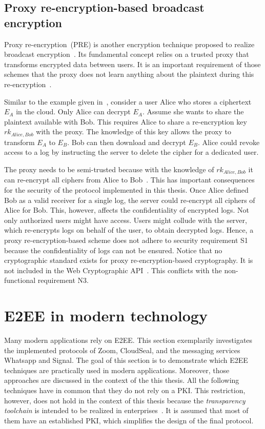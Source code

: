 \documentclass[../main.tex]{subfiles}
\begin{document}
\subsection{Proxy re-encryption-based broadcast encryption}
\label{sec:broadcast-proxy}
Proxy re-encryption~(PRE) is another encryption technique proposed to realize broadcast encryption~\cite{Hagg2022}.
Its fundamental concept relies on a trusted proxy that transforms encrypted data between users.
It is an important requirement of those schemes that the proxy does not learn anything about the plaintext during this re-encryption~\cite{Chen2018}.

Similar to the example given in~\cite{Hagg2022}, consider a user Alice who stores a ciphertext $E_A$ in the cloud.
Only Alice can decrypt $E_A$.
Assume she wants to share the plaintext available with Bob.
This requires Alice to share a re-encryption key $rk_{Alice,Bob}$ with the proxy.
The knowledge of this key allows the proxy to transform $E_A$ to $E_B$.
Bob can then download and decrypt $E_B$.
Alice could revoke access to a log by instructing the server to delete the cipher for a dedicated user.

The proxy needs to be semi-trusted because with the knowledge of $rk_{Alice,Bob}$ it can re-encrypt all ciphers from Alice to Bob~\cite{Chen2018}.
This has important consequences for the security of the protocol implemented in this thesis.
Once Alice defined Bob as a valid receiver for a single log, the server could re-encrypt all ciphers of Alice for Bob.
This, however, affects the confidentiality of encrypted logs.
Not only authorized users might have access.
Users might collude with the server, which re-encrypts logs on behalf of the user, to obtain decrypted logs.
Hence, a proxy re-encryption-based scheme does not adhere to security requirement S1 because the confidentiality of logs can not be ensured.
Notice that no cryptographic standard exists for proxy re-encryption-based cryptography.
It is not included in the Web Cryptographic API~\cite{WebCryptoApi2017}.
This conflicts with the non-functional requirement N3.

\section{E2EE in modern technology}
\label{sec:modern-e2ee}

Many modern applications rely on E2EE. 
This section exemplarily investigates the implemented protocols of Zoom, CloudSeal, and the messaging services Whatsapp and Signal.
The goal of this section is to demonstrate which E2EE techniques are practically used in modern applications.
Moreover, those approaches are discussed in the context of the this thesis.
All the following techniques have in common that they do not rely on a PKI.
This restriction, however, does not hold in the context of this thesis because the \emph{transparency toolchain} is intended to be realized in enterprises~\cite{Zieglmeier2021}.
It is assumed that most of them have an established PKI, which simplifies the design of the final protocol.
\end{document}
